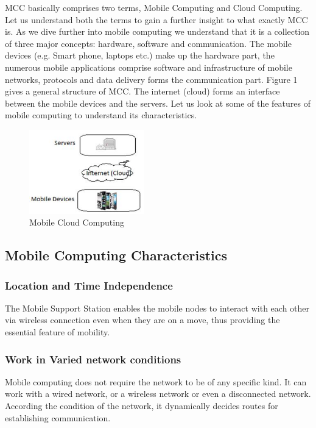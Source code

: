 \documentclass[10pt, conference, compsocconf]{IEEEtran}
\begin{document}
MCC basically comprises two terms, Mobile Computing and Cloud Computing. Let us understand both the terms to gain a further insight to what exactly MCC is. As we dive further into mobile computing we understand that it is a collection of three major concepts: hardware, software and communication. The mobile devices (e.g. Smart phone, laptops etc.) make up the hardware part, the numerous mobile applications comprise software and infrastructure of mobile networks, protocols and data delivery forms the communication part. Figure 1 gives a general structure of MCC. The internet (cloud) forms an interface between the mobile devices and the servers. Let us look at some of the features of mobile computing to understand its characteristics.

\begin{figure}[h!]
\begin{center}
    \includegraphics[scale=0.9, width=50mm]{fig1v2}
\end{center}
\caption{Mobile Cloud Computing}
\end{figure}



\subsection{Mobile Computing Characteristics}
\subsubsection{Location and Time Independence}
The Mobile Support Station enables the mobile nodes to interact with each other via wireless connection even when they are on a move, thus providing the essential feature of mobility.
\subsubsection{Work in Varied network conditions}
Mobile computing does not require the network to be of any specific kind. It can work with a wired network, or a wireless network or even a disconnected network. According the condition of the network, it dynamically decides routes for establishing communication.
\end{document}
